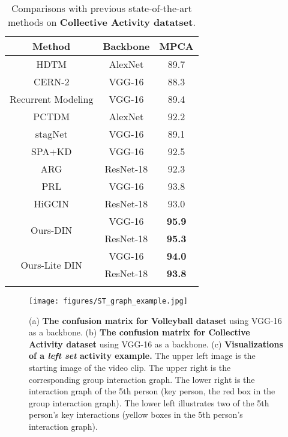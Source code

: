 \documentclass[10pt,twocolumn,letterpaper]{article}
\begin{document}
\begin{table}[t]
  \small
  \centering
    \begin{tabular}{c|cc}
    \Xhline{1.0pt}
    Method & Backbone & MPCA \\
    \hline
    \hline
    HDTM\cite{ibrahim2016hierarchical}  & AlexNet & 89.7  \\
    CERN-2\cite{shu2017cern} & VGG-16 & 88.3  \\
    Recurrent Modeling\cite{wang2017merge_two_class} & VGG-16 & 89.4 \\
    PCTDM\cite{yan2018pctdm} & AlexNet & 92.2  \\
    stagNet\cite{qi2018stagnet} & VGG-16 & 89.1  \\
    SPA+KD\cite{tang2018spa+kd} & VGG-16 & 92.5  \\
    ARG\cite{wu2019learning}   & ResNet-18 & 92.3  \\
    PRL\cite{hu2020prl}   & VGG-16 & 93.8  \\
    HiGCIN\cite{yan2020higcin} & ResNet-18 & 93.0  \\
    \hline
    \multirow{2}[1]{*}{Ours-DIN} & VGG-16 & \textbf{95.9} \\
          & ResNet-18 & \textbf{95.3}  \\
    \hline
    \multirow{2}[1]{*}{Ours-Lite DIN} & VGG-16 & \textbf{94.0} \\
          & ResNet-18 & \textbf{93.8}  \\
    \Xhline{1.0pt}
    \end{tabular}\vspace{0.2cm}
    \caption{Comparisons with previous state-of-the-art methods on \textbf{Collective Activity datatset}.}
  \label{SOTA_Collective}\end{table}

\begin{figure*}[t]
\centering
\texttt{[image: figures/ST\_graph\_example.jpg]} 
\caption{(a) \textbf{The confusion matrix for Volleyball dataset} using VGG-16 as a backbone. (b) \textbf{The confusion matrix for Collective Activity dataset} using VGG-16 as a backbone. (c) \textbf{Visualizations of a \textit{left set} activity example.} The upper left image is the starting image of the video clip. The upper right is the corresponding group interaction graph. The lower right is the interaction graph of the 5th person (key person, the red box in the group interaction graph). The lower left illustrates two of the 5th person's key interactions (yellow boxes in the 5th person's interaction graph).}
\label{STgraph_example}
\end{figure*}
\end{document}
